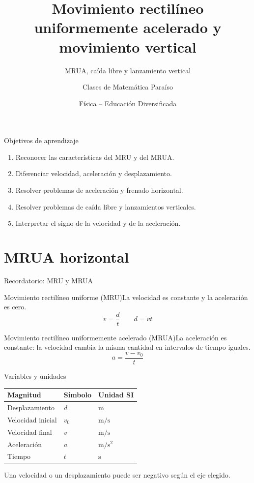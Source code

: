 \documentclass[aspectratio=169,10pt]{beamer}
\title{Movimiento rectilíneo uniformemente acelerado y movimiento vertical}
\subtitle{MRUA, caída libre y lanzamiento vertical}
\author{Clases de Matemática Paraíso}\date{Física -- Educación Diversificada}
\begin{document}
\begin{frame}\titlepage\end{frame}
\begin{frame}{Objetivos de aprendizaje}\begin{enumerate}\item Reconocer las características del MRU y del MRUA.\item Diferenciar velocidad, aceleración y desplazamiento.\item Resolver problemas de aceleración y frenado horizontal.\item Resolver problemas de caída libre y lanzamientos verticales.\item Interpretar el signo de la velocidad y de la aceleración.\end{enumerate}\end{frame}
\section{MRUA horizontal}
\begin{frame}{Recordatorio: MRU y MRUA}\begin{block}{Movimiento rectilíneo uniforme (MRU)}La velocidad es constante y la aceleración es cero.\vspace{2mm}\[v=\frac{d}{t}\qquad d=vt\]\end{block}\begin{block}{Movimiento rectilíneo uniformemente acelerado (MRUA)}La aceleración es constante: la velocidad cambia la misma cantidad en intervalos de tiempo iguales.\vspace{2mm}\[a=\frac{v-v_0}{t}\]\end{block}\end{frame}
\begin{frame}{Variables y unidades}\centering\renewcommand{\arraystretch}{1.35}\begin{tabular}{lll}\toprule Magnitud& Símbolo& Unidad SI\\\midrule Desplazamiento&$d$&$\mathrm{m}$\\Velocidad inicial&$v_0$&$\mathrm{m/s}$\\Velocidad final&$v$&$\mathrm{m/s}$\\Aceleración&$a$&$\mathrm{m/s^2}$\\Tiempo&$t$&$\mathrm{s}$\\\bottomrule\end{tabular}\par\bigskip\alert{Una velocidad o un desplazamiento puede ser negativo según el eje elegido.}\end{frame}
\end{document}

